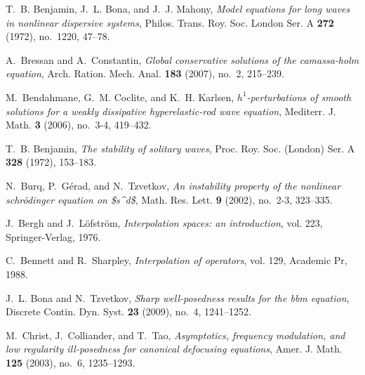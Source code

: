 \documentclass[final]{nddiss2e}
\begin{document}
\backmatter              %
%
\providecommand{\bysame}{\leavevmode\hbox to3em{\hrulefill}\thinspace}
\providecommand{\MR}{\relax\ifhmode\unskip\space\fi MR }
\providecommand{\MRhref}[2]{%
  \href{http://www.ams.org/mathscinet-getitem?mr=#1}{#2}
}
\providecommand{\href}[2]{#2}
\begin{thebibliography}{HKM09}

T.~B. Benjamin, J.~L. Bona, and J.~J. Mahony, \emph{Model equations for long
  waves in nonlinear dispersive systems}, Philos. Trans. Roy. Soc. London Ser.
  A \textbf{272} (1972), no.~1220, 47--78.

A.~Bressan and A.~Constantin, \emph{Global conservative solutions of the
  camassa-holm equation}, Arch. Ration. Mech. Anal. \textbf{183} (2007), no.~2,
  215--239.

M.~Bendahmane, G.~M. Coclite, and K.~H. Karlsen, \emph{$h^1$-perturbations of
  smooth solutions for a weakly dissipative hyperelastic-rod wave equation},
  Mediterr. J. Math. \textbf{3} (2006), no.~3-4, 419--432.

T.~B. Benjamin, \emph{The stability of solitary waves}, Proc. Roy. Soc.
  (London) Ser. A \textbf{328} (1972), 153--183.

N.~Burq, P.~G{\'e}rad, and N.~Tzvetkov, \emph{An instability property of the
  nonlinear schr{\"o}dinger equation on {\$}s\^{}d{\$}}, Math. Res. Lett.
  \textbf{9} (2002), no.~2-3, 323--335.

J.~Bergh and J.~L{\"o}fstr{\"o}m, \emph{Interpolation spaces: an introduction},
  vol. 223, Springer-Verlag, 1976.

C.~Bennett and R.~Sharpley, \emph{Interpolation of operators}, vol. 129,
  Academic Pr, 1988.

J.~L. Bona and N.~Tzvetkov, \emph{Sharp well-posedness results for the bbm
  equation}, Discrete Contin. Dyn. Syst. \textbf{23} (2009), no.~4, 1241--1252.

M.~Christ, J.~Colliander, and T.~Tao, \emph{Asymptotics, frequency modulation,
  and low regularity ill-posedness for canonical defocusing equations}, Amer.
  J. Math. \textbf{125} (2003), no.~6, 1235--1293.


\end{thebibliography}
\end{document}
